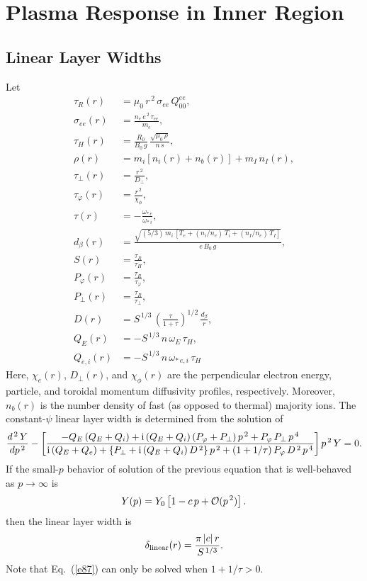 \documentclass[notitlepage,12pt]{article}
\begin{document}
\section{Plasma Response in Inner Region}
\subsection{Linear Layer Widths}\label{linear}
Let
\begin{align}
\tau_R(r) &= \mu_0\,r^{\,2}\,\sigma_{ee}\,Q_{00}^{ee},\\[0.5ex]
\sigma_{ee}(r) &=\frac{n_e\,e^{\,2}\,\tau_{ee}}{m_e},\\[0.5ex]
\tau_H(r) &= \frac{R_0}{B_0\,g}\,\frac{\sqrt{\mu_0\,\rho}}{n\,s},\\[0.5ex]
\rho(r)&= m_i\left[n_i(r) + n_b(r)\right] + m_I\,n_I(r),\\[0.5ex]
\tau_\perp(r) &= \frac{r^{\,2}}{D_\perp},\\[0.5ex]
\tau_\varphi(r) &= \frac{r^{\,2}}{\chi_\phi},\\[0.5ex]
\tau(r)& = -\frac{\omega_{\ast\,e}}{\omega_{\ast\,i}},\\[0.5ex]
d_\beta (r)&= \frac{\sqrt{(5/3)\,m_i\,[T_e + (n_i/n_e)\,T_i + (n_I/n_e)\,T_I]}}{e\,B_0\,g},\\[0.5ex]
S(r) &= \frac{\tau_R}{\tau_H},\\[0.5ex]
P_\varphi(r) &= \frac{\tau_R}{\tau_\varphi},\\[0.5ex]
P_\perp(r) &= \frac{\tau_R}{\tau_\perp},\\[0.5ex]
D(r)&= S^{\,1/3}\,\left(\frac{\tau}{1+\tau}\right)^{1/2}\,\frac{d_\beta}{r},\\[0.5ex]
Q_E(r)&= -S^{\,1/3}\,n\,\omega_E\,\tau_H,\\[0.5ex]
Q_{e,i}(r)&= -S^{\,1/3}\,n\,\omega_{\ast\,e,i}\,\tau_H
\end{align}
Here, $\chi_e(r)$, $D_\perp(r)$, and $\chi_\phi(r)$ are the perpendicular electron energy, particle,
and toroidal momentum diffusivity profiles, respectively. Moreover, $n_b(r)$ is the number density of fast (as opposed to thermal) majority ions. 
The constant-$\psi$ linear layer width is determined from the solution of
\begin{equation}\label{e87}
\frac{d^{\,2}\,Y}{dp^{\,2}} -\left[\frac{-Q_E\,(Q_E+Q_i)+{\rm i}\,(Q_E+Q_i)\,(P_\varphi+P_\perp)\,p^{\,2}+
P_\varphi\,P_\perp\,p^{\,4}}
{{\rm i}\,(Q_E+Q_e) +\{P_\perp + {\rm i}\,(Q_E+Q_i)\,D^{\,2}\}\,p^{\,2}+(1+1/\tau)\,P_\varphi\,D^{\,2}\,p^{\,4}}
\right] p^{\,2}\, Y = 0.
\end{equation}
If the small-$p$ behavior of solution of the previous equation that is well-behaved as $p\rightarrow \infty$ is
\begin{equation}
Y(p) = Y_0\left[1 - c\,p+{\cal O}(p^{\,2})\right].
\end{equation}
then the 
linear layer width is 
\begin{equation}
\delta_{\rm linear}(r) = \frac{\pi\,|c|\,r}{S^{\,1/3}}.
\end{equation}
Note that Eq.~(\ref{e87}) can only be solved when $1+1/\tau>0$. 
\end{document}
